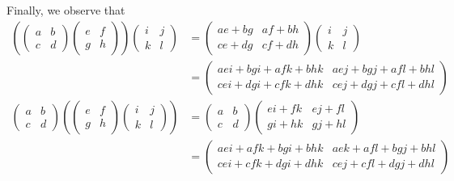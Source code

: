 \documentclass[12pt]{article}
\begin{document}
Finally, we observe that 
\begin{align*}
    \left(\begin{pmatrix}
        a & b\\
        c & d
    \end{pmatrix}\begin{pmatrix}
        e & f\\
        g & h
    \end{pmatrix}\right) \begin{pmatrix}
        i & j\\
        k & l
    \end{pmatrix} &= \begin{pmatrix}
        ae + bg & af + bh\\
        ce + dg & cf + dh
    \end{pmatrix}\begin{pmatrix}
        i & j\\
        k & l
    \end{pmatrix}\\
    &= \begin{pmatrix}
        aei + bgi + afk + bhk & aej + bgj + afl + bhl\\
        cei + dgi + cfk + dhk & cej + dgj + cfl + dhl
    \end{pmatrix}\\
    \begin{pmatrix}
        a & b\\
        c & d
    \end{pmatrix}\left(\begin{pmatrix}
        e & f\\
        g & h
    \end{pmatrix} \begin{pmatrix}
        i & j\\
        k & l
    \end{pmatrix}\right) &= \begin{pmatrix}
        a & b\\
        c & d
    \end{pmatrix} \begin{pmatrix}
        ei + fk & ej + fl\\
        gi + hk & gj + hl
    \end{pmatrix}\\
    &= \begin{pmatrix}
        aei + afk + bgi + bhk & aek + afl + bgj + bhl\\
        cei + cfk + dgi + dhk & cej + cfl + dgj + dhl

\end{pmatrix}
\end{align*}
\end{document}
